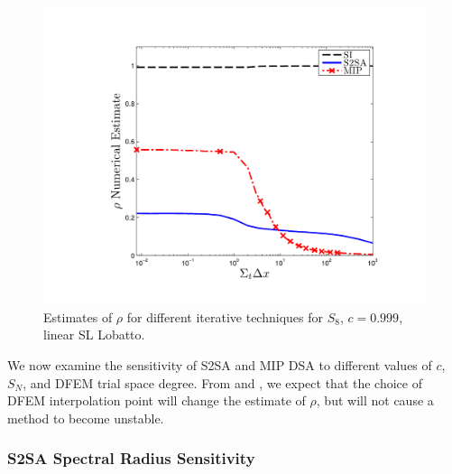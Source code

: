 \begin{figure}[!htp]
\centering
\includegraphics[width=12cm]{chapter4_acceleration/Const_2_P1_Lobatto_Solvers.pdf}
\caption{Estimates of $\rho$ for different iterative techniques for $S_8$, $c=0.999$, linear SL Lobatto.}
\label{fig:p1_lobatto}
\end{figure}
We now examine the sensitivity of S2SA and MIP DSA to different values of $c$, $S_N$, and DFEM trial space degree.
From  and , we expect that the choice of DFEM interpolation point will change the estimate of $\rho$, but will not cause a method to become unstable.

\subsubsection{S2SA Spectral Radius Sensitivity}

